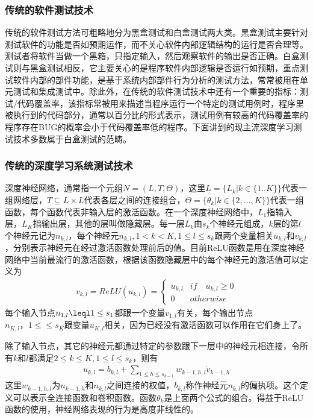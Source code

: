 \subsubsection{传统的软件测试技术}

传统的软件测试方法可粗略地分为黑盒测试和白盒测试两大类。黑盒测试主要针对测试软件的功能是否如预期运作，而不关心软件内部逻辑结构的运行是否合理等。测试者将软件当做一个黑箱，只指定输入，然后观察软件的输出是否正确。白盒测试则与黑盒测试相反，它主要关心的是程序软件内部逻辑是否运行如预期，重点测试软件内部的部件功能，是基于系统内部部件行为分析的测试方法，常常被用在单元测试和集成测试中。除此外，在传统的软件测试技术中还有一个重要的指标：测试/代码覆盖率，该指标常被用来描述当程序运行一个特定的测试用例时，程序里被执行到的代码部分，通常以百分比的形式表示，测试用例有较高的代码覆盖率的程序存在BUG的概率会小于代码覆盖率低的程序。下面讲到的现主流深度学习测试技术多数属于白盒测试的范畴。

\subsubsection{传统的深度学习系统测试技术}

深度神经网络，通常指一个元组$N=(L,T,\Theta)$，这里$L=\{L_k|k\in \{1..K\}\}$代表一组网络层，$T\subseteq L\times L$代表各层之间的连接组合，$\Theta=\{\theta_k|k\in \{2,...,K\}\}$代表一组函数，每个函数代表非输入层的激活函数。在一个深度神经网络中，$L_1$指输入层，$L_K$指输出层，其他的层叫做隐藏层。每一层$L_k$由$s_k$个神经元组成，$k$层的第$l$个神经元记为$n_{k,l}$，每个神经元$n_{k,l},1\lt k \lt K, 1\leq l\leq s_k$跟两个变量相关$u_{k,l}$和$v_{k,l}$，分别表示神经元在经过激活函数处理前后的值。目前ReLU\cite{relu}函数是用在深度神经网络中当前最流行的激活函数，根据该函数隐藏层中的每个神经元的激活值可以定义为
\begin{gather}
    v_{k,l}=ReLU(u_{k,l})=\begin{cases}
        u_{k,l} & if\quad u_{k,l} \geq 0 \\
        0 & otherwise
    \end{cases}
\end{gather}
每个输入节点$n_{1,l}\leql 1 \leq s_1$都跟一个变量$v_{1,l}$有关，每个输出节点$n_{K,l}，1\leq \leq s_K$跟变量$u_{K,l}$相关，因为已经没有激活函数可以作用在它们身上了。 

除了输入节点，其它的神经元都通过特定的参数跟下一层中的神经元相连接，令所有$k$和$l$都满足$2\leq k \leq K, 1\leq l \leq s_k$，则有
\begin{gather}
u_{k,l}=b_{k,l}+\sum_{1\leq h\leq s_{k-1}}w_{k-1,h,l}\dot v_{k-1,h}
\end{gather} 
这里$w_{k-1,h,l}$为$n_{k-1,h}$和$n_{k,l}$之间连接的权值，$b_{k,l}$称作神经元$n_{k,l}$的偏执项。这个定义可以表示全连接函数和卷积函数。函数$\theta_k$是上面两个公式的组合。得益于ReLU函数的使用，神经网络表现的行为是高度非线性的。

